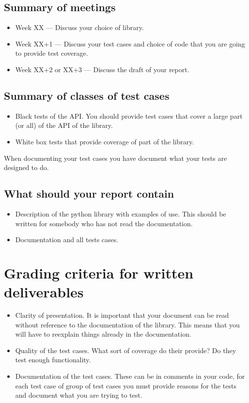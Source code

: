 \documentclass[a4page]{article}
\begin{document}
  \subsection*{Summary of meetings}
  \begin{itemize}
  \item Week XX  --- Discuss your choice of library.
  \item Week XX+1  --- Discuss your test cases and choice of code that you are
    going to provide test coverage.
  \item Week XX+2 or XX+3 --- Discuss the draft of your report.
  \end{itemize}
  \subsection*{Summary of classes of test cases}
  \begin{itemize}
  \item Black tests of the API. You should provide test cases that cover a
    large  part (or all) of the API of the library.
  \item White box tests that provide coverage of part of the library.
  \end{itemize}
  When documenting your test cases you have document what your tests are
  designed to do.

  \subsection*{What should your report contain}
  \begin{itemize}
  \item Description of the python library with examples of use. This should be
    written for somebody who has not read the documentation.
  \item Documentation and all tests cases.
  \end{itemize}
\section{Grading criteria for written deliverables}
\begin{itemize}
\item Clarity of presentation. It is important that your document can
  be read without reference to the documentation of the library. This
  means that you will have to reexplain things already in the
  documentation. 
\item Quality of the test cases. What sort of coverage do their
  provide? Do they test enough functionality. 
\item Documentation of the test cases. These can be in comments in
  your code, for each test case of group of test cases you must
  provide reasons for the tests and document  what you are trying to
  test.
 
\end{itemize}
\end{document}
